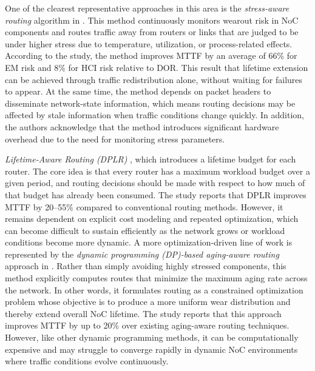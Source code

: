 One of the clearest representative approaches in this area is the \textit{stress-aware routing} algorithm in \cite{Clotho2015}. This method continuously monitors wearout risk in NoC components and routes traffic away from routers or links that are judged to be under higher stress due to temperature, utilization, or process-related effects. According to the study, the method improves MTTF by an average of 66\% for EM risk and 8\% for HCI risk relative to DOR. This result that lifetime extension can be achieved through traffic redistribution alone, without waiting for failures to appear. At the same time, the method depends on packet headers to disseminate network-state information, which means routing decisions may be affected by stale information when traffic conditions change quickly. In addition, the authors acknowledge that the method introduces significant hardware overhead due to the need for monitoring stress parameters.

\textit{Lifetime-Aware Routing (DPLR)} \cite{Wang2016}, which introduces a lifetime budget for each router. The core idea is that every router has a maximum workload budget over a given period, and routing decisions should be made with respect to how much of that budget has already been consumed. The study reports that DPLR improves MTTF by 20--55\% compared to conventional routing methods. However, it remains dependent on explicit cost modeling and repeated optimization, which can become difficult to sustain efficiently as the network grows or workload conditions become more dynamic. A more optimization-driven line of work is represented by the \textit{dynamic programming (DP)-based aging-aware routing} approach in \cite{Wang2019}. Rather than simply avoiding highly stressed components, this method explicitly computes routes that minimize the maximum aging rate across the network. In other words, it formulates routing as a constrained optimization problem whose objective is to produce a more uniform wear distribution and thereby extend overall NoC lifetime. The study reports that this approach improves MTTF by up to 20\% over existing aging-aware routing techniques. However, like other dynamic programming methods, it can be computationally expensive and may struggle to converge rapidly in dynamic NoC environments where traffic conditions evolve continuously.

